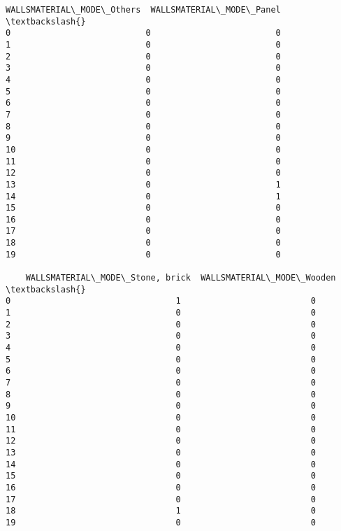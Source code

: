 \documentclass[11pt]{article}
\begin{document}
\begin{Verbatim}[commandchars=\\\{\}]
    WALLSMATERIAL\_MODE\_Others  WALLSMATERIAL\_MODE\_Panel  \textbackslash{}
0                           0                         0   
1                           0                         0   
2                           0                         0   
3                           0                         0   
4                           0                         0   
5                           0                         0   
6                           0                         0   
7                           0                         0   
8                           0                         0   
9                           0                         0   
10                          0                         0   
11                          0                         0   
12                          0                         0   
13                          0                         1   
14                          0                         1   
15                          0                         0   
16                          0                         0   
17                          0                         0   
18                          0                         0   
19                          0                         0   

    WALLSMATERIAL\_MODE\_Stone, brick  WALLSMATERIAL\_MODE\_Wooden  \textbackslash{}
0                                 1                          0   
1                                 0                          0   
2                                 0                          0   
3                                 0                          0   
4                                 0                          0   
5                                 0                          0   
6                                 0                          0   
7                                 0                          0   
8                                 0                          0   
9                                 0                          0   
10                                0                          0   
11                                0                          0   
12                                0                          0   
13                                0                          0   
14                                0                          0   
15                                0                          0   
16                                0                          0   
17                                0                          0   
18                                1                          0   
19                                0                          0   


\end{Verbatim}
\end{document}
